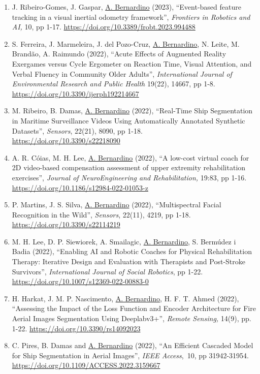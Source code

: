 \begin{enumerate}
\item
  J. Ribeiro-Gomes, J. Gaspar, \ul{A. Bernardino} (2023), ``Event-based
  feature tracking in a visual inertial odometry framework'',
  \emph{Frontiers in Robotics and AI,} 10, pp 1-17.
  \url{https://doi.org/10.3389/frobt.2023.994488}
\item
  S. Ferreira, J. Marmeleira, J. del Pozo-Cruz, \ul{A. Bernardino}, N.
  Leite, M. Brandão, A. Raimundo (2022), ``Acute Effects of Augmented
  Reality Exergames versus Cycle Ergometer on Reaction Time, Visual
  Attention, and Verbal Fluency in Community Older Adults'',
  \emph{International Journal of Environmental Research and Public
  Health} 19(22), 14667, pp 1-8.
  \url{https://doi.org/10.3390/ijerph192214667}~
\item
  M. Ribeiro, B. Damas, \ul{A. Bernardino} (2022), ``Real-Time Ship
  Segmentation in Maritime Surveillance Videos Using Automatically
  Annotated Synthetic Datasets'', \emph{Sensors}, 22(21), 8090, pp 1-18.
  \url{https://doi.org/10.3390/s22218090}~~
\item
  A. R. Cóias, M. H. Lee, \ul{A. Bernardino} (2022), ``A low-cost
  virtual coach for 2D video-based compensation assessment of upper
  extremity rehabilitation exercises'', \emph{Journal of
  NeuroEngineering and Rehabilitation,} 19:83, pp 1-16.
  \url{https://doi.org/10.1186/s12984-022-01053-z}~
\item
  P. Martins, J. S. Silva, \ul{A. Bernardino} (2022), ``Multispectral
  Facial Recognition in the Wild'', \emph{Sensors}, 22(11), 4219, pp
  1-18. \url{https://doi.org/10.3390/s22114219}~
\item
  M. H. Lee, D. P. Siewiorek, A. Smailagic, \ul{A. Bernardino}, S.
  Bermúdez i Badia (2022), ``Enabling AI and Robotic Coaches for
  Physical Rehabilitation Therapy: Iterative Design and Evaluation with
  Therapists and Post-Stroke Survivors'', \emph{International Journal of
  Social Robotics}, pp 1-22.
  \url{https://doi.org/10.1007/s12369-022-00883-0}~
\item
  H. Harkat, J. M. P. Nascimento, \ul{A. Bernardino}, H. F. T. Ahmed
  (2022), ``Assessing the Impact of the Loss Function and Encoder
  Architecture for Fire Aerial Images Segmentation Using Deeplabv3+'',
  \emph{Remote Sensing,} 14(9), pp. 1-22.
  \url{https://doi.org/10.3390/rs14092023}~
\item
  C. Pires, B. Damas and \ul{A. Bernardino} (2022), ``An Efficient
  Cascaded Model for Ship Segmentation in Aerial Images'', \emph{IEEE
  Access},~10, pp 31942-31954.
  \url{https://doi.org/10.1109/ACCESS.2022.3159667}~

\end{enumerate}
